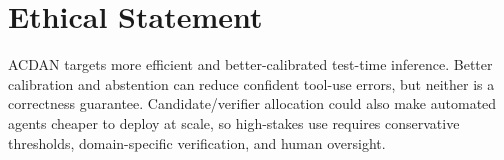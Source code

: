 \documentclass[letterpaper]{article} %
\begin{document}
\section*{Ethical Statement}
ACDAN targets more efficient and better-calibrated test-time inference. Better
calibration and abstention can reduce confident tool-use errors, but neither is
a correctness guarantee. Candidate/verifier allocation could also make automated
agents cheaper to deploy at scale, so high-stakes use requires conservative
thresholds, domain-specific verification, and human oversight.




\end{document}

